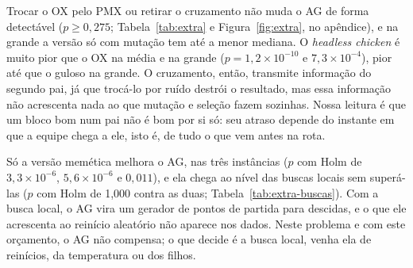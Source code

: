 \begin{table}[tbp]
  \centering
  \caption{Experimento extra: variantes do AG. Testes de Mann--Whitney contra o AG-OX, com correção de Holm sobre as quatro comparações de cada instância.}
  \label{tab:extra}
\end{table}

Trocar o OX pelo PMX ou retirar o cruzamento não muda o AG de forma detectável ($p \ge 0{,}275$; Tabela~\ref{tab:extra} e Figura~\ref{fig:extra}, no apêndice), e na grande a versão só com mutação tem até a menor mediana.
O \textit{headless chicken} é muito pior que o OX na média e na grande ($p = 1{,}2\times10^{-10}$ e $7{,}3\times10^{-4}$), pior até que o guloso na grande.
O cruzamento, então, transmite informação do segundo pai, já que trocá-lo por ruído destrói o resultado, mas essa informação não acrescenta nada ao que mutação e seleção fazem sozinhas.
Nossa leitura é que um bloco bom num pai não é bom por si só: seu atraso depende do instante em que a equipe chega a ele, isto é, de tudo o que vem antes na rota.

Só a versão memética melhora o AG, nas três instâncias ($p$ com Holm de $3{,}3\times10^{-6}$, $5{,}6\times10^{-6}$ e $0{,}011$), e ela chega ao nível das buscas locais sem superá-las ($p$ com Holm de 1,000 contra as duas; Tabela~\ref{tab:extra-buscas}).
Com a busca local, o AG vira um gerador de pontos de partida para descidas, e o que ele acrescenta ao reinício aleatório não aparece nos dados.
Neste problema e com este orçamento, o AG não compensa; o que decide é a busca local, venha ela de reinícios, da temperatura ou dos filhos.
